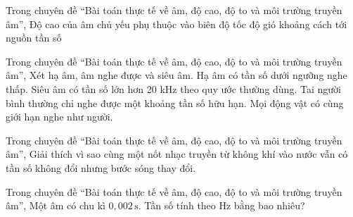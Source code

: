 \begin{ex}
Trong chuyên đề “Bài toán thực tế về âm, độ cao, độ to và môi trường truyền âm”, Độ cao của âm chủ yếu phụ thuộc vào
\choice
{biên độ}
{tốc độ gió}
{khoảng cách tới nguồn}
{\True tần số}
\end{ex}

\begin{ex}
Trong chuyên đề “Bài toán thực tế về âm, độ cao, độ to và môi trường truyền âm”, Xét hạ âm, âm nghe được và siêu âm.
\choiceTF
{\True Hạ âm có tần số dưới ngưỡng nghe thấp.}
{\True Siêu âm có tần số lớn hơn 20 kHz theo quy ước thường dùng.}
{\True Tai người bình thường chỉ nghe được một khoảng tần số hữu hạn.}
{Mọi động vật có cùng giới hạn nghe như người.}
\end{ex}

\begin{ex}
Trong chuyên đề “Bài toán thực tế về âm, độ cao, độ to và môi trường truyền âm”, Giải thích vì sao cùng một nốt nhạc truyền từ không khí vào nước vẫn có tần số không đổi nhưng bước sóng thay đổi.
\choiceTF

\end{ex}

\begin{ex}
Trong chuyên đề “Bài toán thực tế về âm, độ cao, độ to và môi trường truyền âm”, Một âm có chu kì $0,002\,\text{s}$. Tần số tính theo Hz bằng bao nhiêu?
\end{ex}

